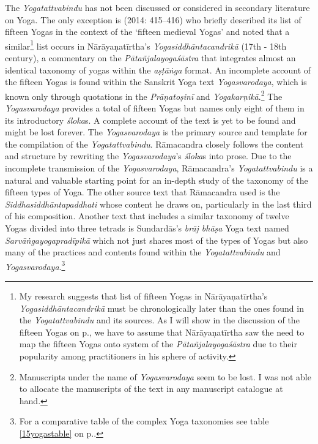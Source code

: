 The \textit{Yogatattvabindu} has not been discussed or considered in secondary literature on Yoga. The only exception is \citeauthor{birch2014} (2014: 415–416) who briefly described its list of fifteen Yogas in the context of the `fifteen medieval Yogas' and noted that a similar\footnote{My research suggests that list of fifteen Yogas in Nārāyaṇatīrtha’s \textit{Yogasiddhāntacandrikā} must be chronologically later than the ones found in the \textit{Yogatattvabindu} and its sources. As I will show in the discussion of the fifteen Yogas on p.\pageref{15yogas}, we have to assume that Nārāyaṇatīrtha saw the need to map the fifteen Yogas onto system of the \textit{Pātañjalayogaśāstra} due to their popularity among practitioners in his sphere of activity.} list occurs in Nārāyaṇatīrtha’s \textit{Yogasiddhāntacandrikā} (17th - 18th century), a commentary on the \textit{Pātañjalayogaśāstra} that integrates almost an identical taxonomy of yogas within the \textit{aṣṭāṅga} format. An incomplete account of the fifteen Yogas is found within the Sanskrit Yoga text \textit{Yogasvarodaya}, which is known only through quotations in the \textit{Prāṇatoṣinī} and \textit{Yogakarṇikā}.\footnote{Manuscripts under the name of \textit{Yogasvarodaya} seem to be lost. I was not able to allocate the manuscripts of the text in any manuscript catalogue at hand.} The \textit{Yogasvarodaya} provides a total of fifteen Yogas but names only eight of them in its introductory \textit{śloka}s. A complete account of the text is yet to be found and might be lost forever. The \textit{Yogasvarodaya} is the primary source and template for the compilation of the \textit{Yogatattvabindu}. Rāmacandra closely follows the content and structure by rewriting the \textit{Yogasvarodaya}’s \textit{śloka}s into prose. Due to the incomplete transmission of the \textit{Yogasvarodaya}, Rāmacandra’s \textit{Yogatattvabindu} is a natural and valuable starting point for an in-depth study of the taxonomy of the fifteen types of Yoga. The other source text that Rāmacandra used is the \textit{Siddhasiddhāntapaddhati} whose content he draws on, particularly in the last third of his composition. Another text that includes a similar taxonomy of twelve Yogas divided into three tetrads is Sundardās’s \textit{brāj bhāṣa} Yoga text named \textit{Sarvāṅgayogapradīpikā} which not just shares most of the types of Yogas but also many of the practices and contents found within the \textit{Yogatattvabindu} and \textit{Yogasvarodaya}.\footnote{For a comparative table of the complex Yoga taxonomies see table \ref{15yogastable} on p.\pageref{15yogastable}.}


